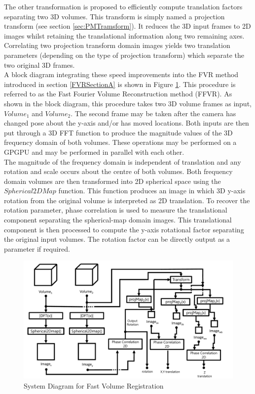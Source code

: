 The other transformation is proposed to efficiently compute translation factors separating two 3D volumes. This transform is simply named a projection transform (see section \ref{sec:PMTramsform}). It reduces the 3D input frames to 2D images whilst retaining the translational information along two remaining axes. Correlating two projection transform domain images yields two translation parameters (depending on the type of projection transform) which separate the two original 3D frames. \\

A block diagram integrating these speed improvements into the FVR method introduced in section \ref{FVRSectionA} is shown in Figure \ref{fig:PIPELINE3}. This procedure is referred to as the Fast Fourier Volume Reconstruction method (FFVR). As shown in the block diagram, this procedure takes two 3D volume frames as input, $Volume_1$ and $Volume_2$. The second frame may be taken after the camera has changed pose about the y-axis and/or has moved locations. Both inputs are then put through a 3D FFT function to produce the magnitude values of the 3D frequency domain of both volumes. These operations may be performed on a GPGPU and may be performed in parallel with each other. \\

The magnitude of the frequency domain is independent of translation and any rotation and scale occurs about the centre of both volumes. Both frequency domain volumes are then transformed into 2D spherical space using the $Spherical2DMap$ function. This function produces an image in which 3D y-axis rotation from the original volume is interpreted as 2D translation. To recover the rotation parameter, phase correlation is used to measure the translational component separating the spherical-map domain images. This translational component is then processed to compute the y-axis rotational factor separating the original input volumes. The rotation factor can be directly output as a parameter if required. \\


\begin{figure}[!h]
\centering
\includegraphics[width=5.0in]{images/ch2/pipeline3}
\caption{System Diagram for Fast Volume Registration}
\label{fig:PIPELINE3}
\end{figure}

